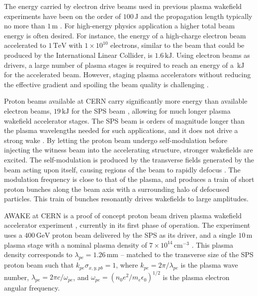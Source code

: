 \documentclass[aps,prstab,reprint,amsmath,amssymb,groupedaddress]{revtex4-1}
\newcommand{\unit}[1]{\,\mathrm{#1}}
\newcommand{\nexp}[1]{\times 10^{#1}}
\begin{document}
The energy carried by electron drive beams used in previous plasma wakefield experiments have been on the order of
$100\unit{J}$ and the propagation length typically no more than $1\unit{m}$ \cite{blumenfeld:2007, caldwell:2009}.
For high-energy physics application a higher total beam energy is often desired. For instance, the energy of a
high-charge electron beam accelerated to $1\unit{TeV}$ with $1\nexp{10}$ electrons, similar to the beam that could be
produced by the International Linear Collider, is $1.6\unit{kJ}$. Using electron beams as drivers, a large number of
plasma stages is required to reach an energy of a $\unit{kJ}$ for the accelerated beam. However, staging plasma
accelerators without reducing the effective gradient and spoiling the beam quality is challenging
\cite{steinke:2016, lindstrom:2016}.

Proton beams available at CERN carry significantly more energy than available electron beams, $19\unit{kJ}$ for the SPS
beam \cite{gschwendtner:2016}, allowing for much longer plasma wakefield accelerator stages. The SPS beam is orders of
magnitude longer than the plasma wavelengths needed for such applications, and it does not drive a strong wake
\cite{gschwendtner:2016}. By letting the proton beam undergo self-modulation before injecting the witness beam into the
accelerating structure, stronger wakefields are excited. The self-modulation is produced by the transverse fields
generated by the beam acting upon itself, causing regions of the beam to rapidly defocus \cite{kumar:2010}. The
modulation frequency is close to that of the plasma, and produces a train of short proton bunches along the beam axis
with a surrounding halo of defocused particles. This train of bunches resonantly drives wakefields to large amplitudes.

AWAKE at CERN is a proof of concept proton beam driven plasma wakefield accelerator experiment
\cite{awake_collaboration:2014}, currently in its first phase of operation. The experiment uses a $400\unit{GeV}$ proton
beam delivered by the SPS as its driver, and a single $10\unit{m}$ plasma stage with a nominal plasma density of
$7\nexp{14}\unit{cm}^{-3}$ \cite{gschwendtner:2016}. This plasma density corresponds to $\lambda_{pe} = 1.26\unit{mm}$
-- matched to the transverse size of the SPS proton beam such that $k_{pe}\sigma_{x,y,pb} = 1$, where
$k_{pe} = 2\pi/\lambda_{pe}$ is the plasma wave number, $\lambda_{pe} = 2\pi c/\omega_{pe}$, and
$\omega_{pe} = \left(n_0e^2/m_e\epsilon_0\right)^{1/2}$ is the plasma electron angular frequency.
\end{document}
